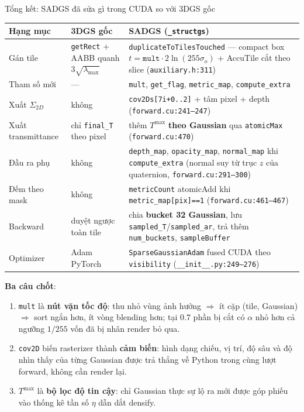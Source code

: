 \begin{frame}{Tổng kết: SADGS đã sửa gì trong CUDA so với 3DGS gốc}
\scriptsize
\centering
\begin{tabular}{p{3.0cm}p{4.3cm}p{4.9cm}}
\toprule
\textbf{Hạng mục} & \textbf{3DGS gốc} & \textbf{SADGS (\texttt{\_structgs})}\\
\midrule
Gán tile & \texttt{getRect} + AABB quanh $3\sqrt{\lambda_{\max}}$ & \texttt{duplicateToTilesTouched} --- compact box $t=\texttt{mult}\cdot 2\ln(255\sigma_o)$ + AccuTile cắt theo slice (\texttt{auxiliary.h:311})\\
Tham số mới & --- & \texttt{mult}, \texttt{get\_flag}, \texttt{metric\_map}, \texttt{compute\_extra}\\
Xuất $\Sigma_{2D}$ & không & \texttt{cov2Ds[7i+0..2]} + tâm pixel + depth (\texttt{forward.cu:241--247})\\
Xuất transmittance & chỉ \texttt{final\_T} theo pixel & thêm $T^{\max}$ \textbf{theo Gaussian} qua \texttt{atomicMax} (\texttt{forward.cu:470})\\
Đầu ra phụ & không & \texttt{depth\_map}, \texttt{opacity\_map}, \texttt{normal\_map} khi \texttt{compute\_extra} (normal suy từ trục $z$ của quaternion, \texttt{forward.cu:291--300})\\
Đếm theo mask & không & \texttt{metricCount} atomicAdd khi \texttt{metric\_map[pix]==1} (\texttt{forward.cu:461--467})\\
Backward & duyệt ngược toàn tile & chia \textbf{bucket 32 Gaussian}, lưu \texttt{sampled\_T}/\texttt{sampled\_ar}, trả thêm \texttt{num\_buckets}, \texttt{sampleBuffer}\\
Optimizer & Adam PyTorch & \texttt{SparseGaussianAdam} fused CUDA theo \texttt{visibility} (\texttt{\_\_init\_\_.py:249--276})\\
\bottomrule
\end{tabular}
\raggedright
\vspace{0.2cm}
\textbf{Ba câu chốt}:
\begin{enumerate}\itemsep1pt
    \item \texttt{mult} là \textbf{nút vặn tốc độ}: thu nhỏ vùng ảnh hưởng $\Rightarrow$ ít cặp (tile, Gaussian) $\Rightarrow$ sort ngắn hơn, ít vòng blending hơn; tại $0.7$ phần bị cắt có $\alpha$ nhỏ hơn cả ngưỡng $1/255$ vốn đã bị nhân render bỏ qua.
    \item \texttt{cov2D} biến rasterizer thành \textbf{cảm biến}: hình dạng chiếu, vị trí, độ sâu và độ nhìn thấy của từng Gaussian được trả thẳng về Python trong cùng lượt forward, không cần render lại.
    \item $T^{\max}$ là \textbf{bộ lọc độ tin cậy}: chỉ Gaussian thực sự lộ ra mới được góp phiếu vào thống kê tần số $\eta$ dẫn dắt densify.
\end{enumerate}
\end{frame}
